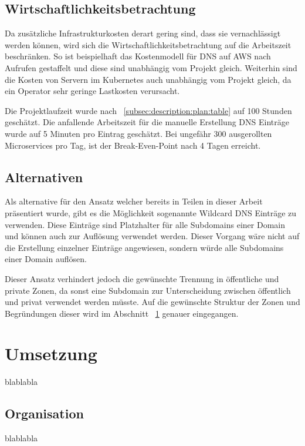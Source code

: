 \subsection{Wirtschaftlichkeitsbetrachtung}
\label{subsec:description:wirtschaftlichkeitsbetrachtung}
Da zusätzliche Infrastrukturkosten derart gering sind, dass sie vernachlässigt werden können, wird sich die Wirtschaftlichkeitsbetrachtung auf die Arbeitszeit beschränken.
So ist beispielhaft das Kostenmodell für DNS auf AWS nach Aufrufen gestaffelt und diese sind unabhängig vom Projekt gleich.
Weiterhin sind die Kosten von Servern im Kubernetes auch unabhängig vom Projekt gleich, da ein Operator sehr geringe Lastkosten verursacht.

Die Projektlaufzeit wurde nach ~\ref{subsec:description:plan:table} auf 100 Stunden geschätzt.
Die anfallende Arbeitszeit für die manuelle Erstellung DNS Einträge wurde auf 5 Minuten pro Eintrag geschätzt.
Bei ungefähr 300 ausgerollten Microservices pro Tag, ist der Break-Even-Point nach 4 Tagen erreicht.

\subsection{Alternativen}
\label{subsec:description:alternativen}
Als alternative für den Ansatz welcher bereits in Teilen in dieser Arbeit präsentiert wurde, gibt es die Möglichkeit sogenannte Wildcard DNS Einträge zu verwenden.
Diese Einträge sind Platzhalter für alle Subdomains einer Domain und können auch zur Auflösung verwendet werden.
Dieser Vorgang wäre nicht auf die Erstellung einzelner Einträge angewiesen, sondern würde alle Subdomains einer Domain auflösen.
\medskip

Dieser Ansatz verhindert jedoch die gewünschte Trennung in öffentliche und private Zonen, da sonst eine Subdomain zur Unterscheidung zwischen öffentlich und privat verwendet werden müsste.
Auf die gewünschte Struktur der Zonen und Begründungen dieser wird im Abschnitt ~\ref{sec:description:umsetzung} genauer eingegangen.

\section{Umsetzung}
\label{sec:description:umsetzung}
blablabla

\subsection{Organisation}
\label{subsec:description:Organisation}
blablabla

